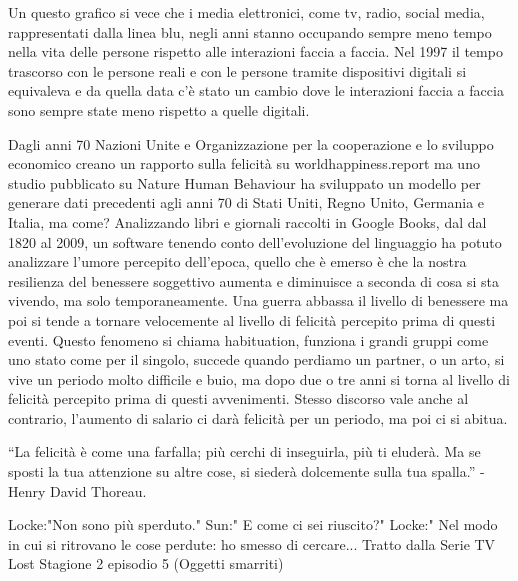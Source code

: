 \documentclass[12pt]{book} %
\begin{document}
\begin{mdframed}[linewidth=1pt]
Un questo grafico si vece che i media elettronici, come tv, radio, social media, rappresentati dalla linea blu, negli anni stanno occupando sempre meno tempo nella vita delle persone rispetto alle interazioni faccia a faccia. Nel 1997 il tempo trascorso con le persone reali e con le persone tramite dispositivi digitali si equivaleva e da quella data c'è stato un cambio dove le interazioni faccia a faccia sono sempre state meno rispetto a quelle digitali.

\end{mdframed}

Dagli anni 70 Nazioni Unite e Organizzazione per la cooperazione e lo sviluppo economico creano un rapporto sulla
felicità su worldhappiness.report ma uno studio pubblicato su Nature Human
Behaviour ha sviluppato un modello per generare dati
precedenti agli anni 70 di Stati Uniti, Regno Unito, Germania e Italia, ma come? Analizzando libri e giornali raccolti
in Google Books, dal dal 1820 al 2009, un software tenendo conto dell'evoluzione del linguaggio ha
potuto analizzare l'umore percepito dell'epoca, quello che è emerso è che la
nostra resilienza del benessere soggettivo aumenta e diminuisce a seconda di cosa si sta vivendo, ma solo
temporaneamente. Una guerra abbassa il livello di benessere ma poi si tende a tornare velocemente al livello di
felicità percepito prima di questi eventi. Questo fenomeno si chiama habituation, funziona i grandi gruppi come uno
stato come per il singolo, succede quando perdiamo un partner, o un arto, si vive un periodo molto difficile e buio, ma
dopo due o tre anni si torna al livello di felicità percepito prima di questi avvenimenti. Stesso discorso vale anche
al contrario, l'aumento di salario ci darà felicità per un periodo, ma poi ci si
abitua.


\bigskip

“La felicità è come una farfalla; più cerchi di inseguirla, più ti eluderà. Ma se sposti la tua attenzione su altre
cose, si siederà dolcemente sulla tua spalla.” - Henry David Thoreau.

Locke:"Non sono più sperduto." 
Sun:" E come ci sei riuscito?" 
Locke:" Nel modo in cui si ritrovano le cose perdute: ho smesso di cercare...
Tratto dalla Serie TV Lost Stagione 2 episodio 5 (Oggetti smarriti)
\end{document}
